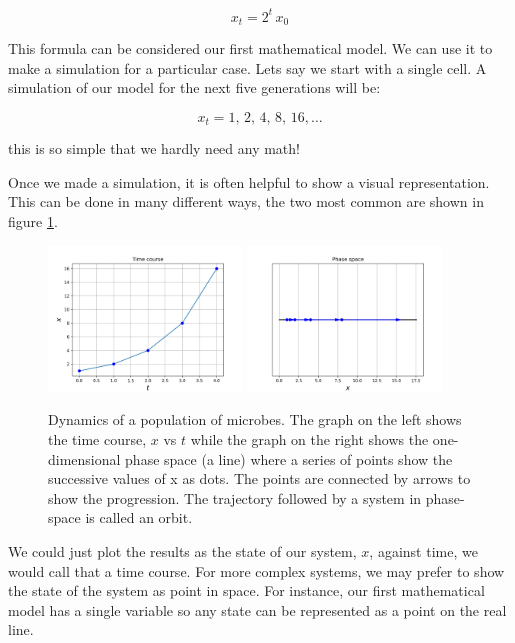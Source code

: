 \begin{equation}
	x_{t} = 2^t \, x_0
\end{equation}

This formula can be considered our first mathematical model. We can use it to make a simulation for a particular case. Lets say we start with a single cell. A simulation of our model for the next five generations will be:

\begin{equation}
	x_{t} =1 ,\, 2 ,\,4 ,\,8 ,\,16,\dots
\end{equation}

this is so simple that we hardly need any math!

Once we made a simulation, it is often helpful to show a visual representation. This can be done in many different ways, the two most common are shown in figure \ref{fig:tcourse}. 


\begin{figure}
	\begin{center}
		\includegraphics[width=0.46\textwidth]{time_course}
		\includegraphics[width=0.46\textwidth]{phase_space}
	\end{center}
	\caption{Dynamics of a population of microbes. The graph on the left shows the time course, $x$ vs $t$ while the graph on the right shows the one-dimensional phase space (a line) where a series of points show the successive values of x as dots. The points are connected by arrows to show the progression. The trajectory followed by a system in phase-space is called an orbit.}
	\label{fig:tcourse}
\end{figure}

 We could just plot the results as the state of our system, $x$, against time, we would call that a time course. For more complex systems, we may prefer to show the state of the system as point in space. For instance, our first mathematical model has a single variable so any  state can be represented as a point on the real line.